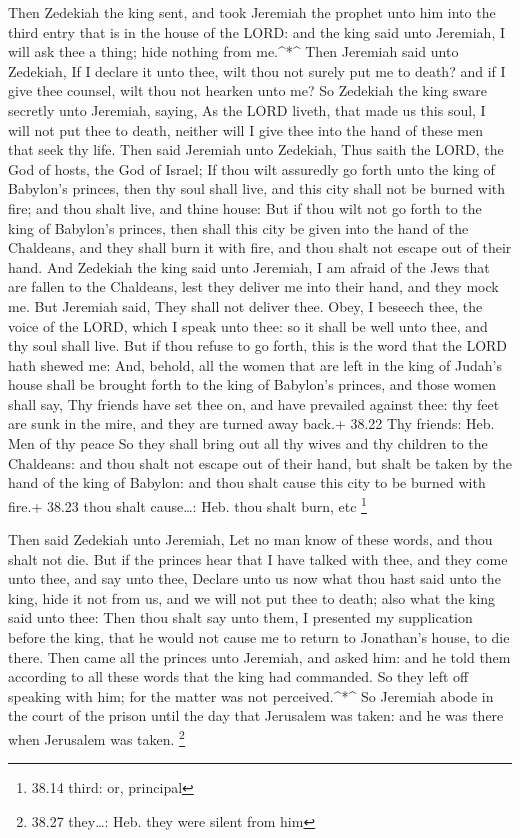  Then Zedekiah the king sent, and took Jeremiah the prophet
unto him into the third entry that is in the house of the LORD: and the
king said unto Jeremiah, I will ask thee a thing; hide nothing from
me.\^{}*\^{}  Then Jeremiah said unto Zedekiah, If I
declare it unto thee, wilt thou not surely put me to death? and if I
give thee counsel, wilt thou not hearken unto me?  So
Zedekiah the king sware secretly unto Jeremiah, saying, As the LORD
liveth, that made us this soul, I will not put thee to death, neither
will I give thee into the hand of these men that seek thy life.
 Then said Jeremiah unto Zedekiah, Thus saith the LORD, the
God of hosts, the God of Israel; If thou wilt assuredly go forth unto
the king of Babylon's princes, then thy soul shall live, and this city
shall not be burned with fire; and thou shalt live, and thine house:
 But if thou wilt not go forth to the king of Babylon's
princes, then shall this city be given into the hand of the Chaldeans,
and they shall burn it with fire, and thou shalt not escape out of their
hand.  And Zedekiah the king said unto Jeremiah, I am
afraid of the Jews that are fallen to the Chaldeans, lest they deliver
me into their hand, and they mock me.  But Jeremiah said,
They shall not deliver thee. Obey, I beseech thee, the voice of the
LORD, which I speak unto thee: so it shall be well unto thee, and thy
soul shall live.  But if thou refuse to go forth, this is
the word that the LORD hath shewed me:  And, behold, all
the women that are left in the king of Judah's house shall be brought
forth to the king of Babylon's princes, and those women shall say, Thy
friends have set thee on, and have prevailed against thee: thy feet are
sunk in the mire, and they are turned away back.+ 38.22 Thy friends:
Heb. Men of thy peace  So they shall bring out all thy
wives and thy children to the Chaldeans: and thou shalt not escape out
of their hand, but shalt be taken by the hand of the king of Babylon:
and thou shalt cause this city to be burned with fire.+ 38.23 thou shalt
cause\ldots: Heb. thou shalt burn, etc \footnote{38.14 third: or,
  principal}

 Then said Zedekiah unto Jeremiah, Let no man know of these
words, and thou shalt not die.  But if the princes hear
that I have talked with thee, and they come unto thee, and say unto
thee, Declare unto us now what thou hast said unto the king, hide it not
from us, and we will not put thee to death; also what the king said unto
thee:  Then thou shalt say unto them, I presented my
supplication before the king, that he would not cause me to return to
Jonathan's house, to die there.  Then came all the princes
unto Jeremiah, and asked him: and he told them according to all these
words that the king had commanded. So they left off speaking with him;
for the matter was not perceived.\^{}*\^{}  So Jeremiah
abode in the court of the prison until the day that Jerusalem was taken:
and he was there when Jerusalem was taken. \footnote{38.27 they\ldots:
  Heb. they were silent from him}

